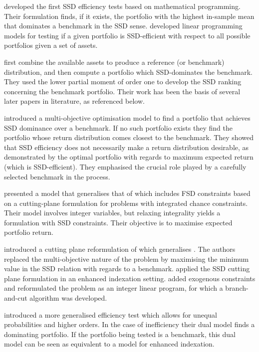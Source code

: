  \cite{kuosmanen2004, kuosmanen2001}
developed the first SSD efficiency tests based on mathematical programming. Their formulation finds, if it exists,  
the portfolio with the highest in-sample mean that dominates a benchmark in the SSD sense.
\cite{post2003} developed linear programming models for testing if a given portfolio is SSD-efficient with respect to all possible portfolios given a set of assets. 

\cite{dentcheva2006, dentcheva2003} first combine the available assets to produce a reference (or benchmark) distribution, and then compute a portfolio which SSD-dominates the benchmark. They used the lower partial moment of order one to develop the SSD ranking concerning the benchmark portfolio. Their work has been the basis of several later papers in literature, as referenced below.

\cite{roman2006} introduced a multi-objective optimisation model to find a portfolio that achieves SSD dominance over a benchmark. If no such portfolio exists they find the portfolio whose return distribution comes closest to the benchmark. They showed that SSD efficiency does not necessarily make a return distribution desirable, as demonstrated by the optimal portfolio with regards to maximum expected return (which is SSD-efficient). They emphasised the crucial role played by a carefully selected benchmark in the process.

\cite{luedtke2008} presented a model that generalises that of \cite{kuosmanen2004} which includes FSD constraints based on a cutting-plane formulation for problems with integrated chance constraints. Their model involves integer variables, but relaxing integrality yields a formulation with SSD constraints. Their objective is to maximise expected portfolio return.

\cite{fabian2011,fabian2011b} introduced a cutting plane reformulation of \cite{roman2006} which generalises \cite{dentcheva2006}. The authors replaced the multi-objective nature of the problem by maximising the minimum value in the SSD relation with regards to a benchmark. 
\cite{roman2013} applied the SSD cutting plane formulation in an enhanced indexation setting. \cite{valle2017} added exogenous constraints and 
reformulated the problem as an integer linear program, for which a branch-and-cut algorithm was developed.

\cite{kopa2015, post2013} introduced a more generalised efficiency test which allows for unequal probabilities and higher orders. In the case of inefficiency
their dual 
model finds a dominating portfolio. If the portfolio being tested is a benchmark, this dual model can be seen as equivalent to a model for
enhanced indexation. 

